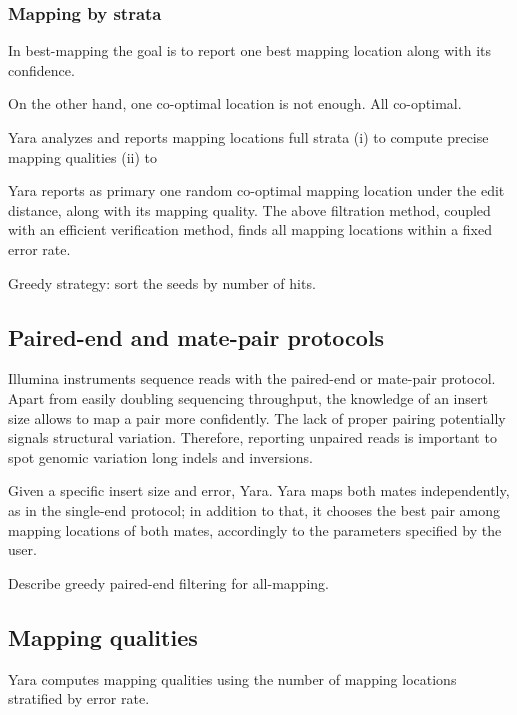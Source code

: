 \subsubsection{Mapping by strata}

In best-mapping the goal is to report one best mapping location along with its confidence.

On the other hand, one co-optimal location is not enough.
All co-optimal.

Yara analyzes and reports mapping locations full strata
(i) to compute precise mapping qualities
(ii) to 

Yara reports as primary one random co-optimal mapping location under the edit distance, along with its mapping quality.
The above filtration method, coupled with an efficient verification method, finds all mapping locations within a fixed error rate.

Greedy strategy: sort the seeds by number of hits.

\subsection{Paired-end and mate-pair protocols}

Illumina instruments sequence reads with the paired-end or mate-pair protocol.
Apart from easily doubling sequencing throughput, the knowledge of an insert size allows to map a pair more confidently.
The lack of proper pairing potentially signals structural variation.
Therefore, reporting unpaired reads is important to spot genomic variation \eg long indels and inversions.

Given a specific insert size and error, Yara.
Yara maps both mates independently, as in the single-end protocol; in addition to that, it chooses the best pair among mapping locations of both mates, accordingly to the parameters specified by the user.



Describe greedy paired-end filtering for all-mapping.

\subsection{Mapping qualities}

Yara computes mapping qualities using the number of mapping locations stratified by error rate.


